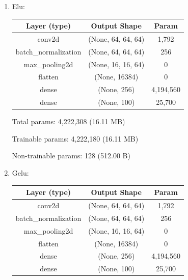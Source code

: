 \documentclass{article}
\begin{document}
\begin{enumerate}
            \item Elu:
            \begin{table}[h!]
                \begin{tabular}{| c | c | c |}
                    \hline
                    Layer (type) & Output Shape & Param \\
                    \hline
                    conv2d & (None, 64, 64, 64) & 1,792 \\
                    \hline
                    batch\_normalization & (None, 64, 64, 64) & 256 \\
                    \hline
                    max\_pooling2d & (None, 16, 16, 64) & 0 \\
                    \hline
                    flatten & (None, 16384) & 0 \\
                    \hline
                    dense & (None, 256) &  4,194,560 \\
                    \hline
                    dense & (None, 100) &  25,700 \\
                    \hline
                \end{tabular}
            \end{table}

            Total params: 4,222,308 (16.11 MB)

            Trainable params: 4,222,180 (16.11 MB)

            Non-trainable params: 128 (512.00 B)
        
            \item Gelu:
            \begin{table}[h!]
                \begin{tabular}{| c | c | c |}
                    \hline
                    Layer (type) & Output Shape & Param \\
                    \hline
                    conv2d & (None, 64, 64, 64) & 1,792 \\
                    \hline
                    batch\_normalization & (None, 64, 64, 64) & 256 \\
                    \hline
                    max\_pooling2d & (None, 16, 16, 64) & 0 \\
                    \hline
                    flatten & (None, 16384) & 0 \\
                    \hline
                    dense & (None, 256) &  4,194,560 \\
                    \hline
                    dense & (None, 100) &  25,700 \\
                    \hline
                \end{tabular}
            \end{table}


\end{enumerate}
\end{document}
